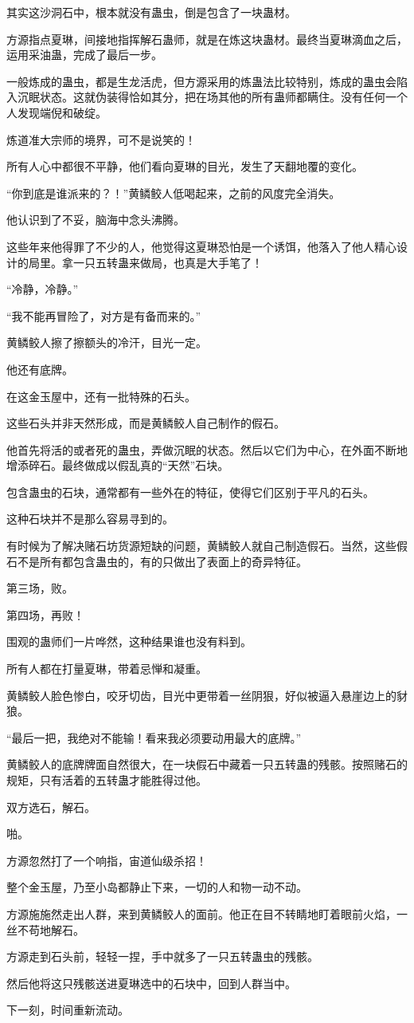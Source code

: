 \begin{this_body}
其实这沙洞石中，根本就没有蛊虫，倒是包含了一块蛊材。

方源指点夏琳，间接地指挥解石蛊师，就是在炼这块蛊材。最终当夏琳滴血之后，运用采油蛊，完成了最后一步。

一般炼成的蛊虫，都是生龙活虎，但方源采用的炼蛊法比较特别，炼成的蛊虫会陷入沉眠状态。这就伪装得恰如其分，把在场其他的所有蛊师都瞒住。没有任何一个人发现端倪和破绽。

炼道准大宗师的境界，可不是说笑的！

所有人心中都很不平静，他们看向夏琳的目光，发生了天翻地覆的变化。

“你到底是谁派来的？！”黄鳞鲛人低喝起来，之前的风度完全消失。

他认识到了不妥，脑海中念头沸腾。

这些年来他得罪了不少的人，他觉得这夏琳恐怕是一个诱饵，他落入了他人精心设计的局里。拿一只五转蛊来做局，也真是大手笔了！

“冷静，冷静。”

“我不能再冒险了，对方是有备而来的。”

黄鳞鲛人擦了擦额头的冷汗，目光一定。

他还有底牌。

在这金玉屋中，还有一批特殊的石头。

这些石头并非天然形成，而是黄鳞鲛人自己制作的假石。

他首先将活的或者死的蛊虫，弄做沉眠的状态。然后以它们为中心，在外面不断地增添碎石。最终做成以假乱真的“天然”石块。

包含蛊虫的石块，通常都有一些外在的特征，使得它们区别于平凡的石头。

这种石块并不是那么容易寻到的。

有时候为了解决赌石坊货源短缺的问题，黄鳞鲛人就自己制造假石。当然，这些假石不是所有都包含蛊虫的，有的只做出了表面上的奇异特征。

第三场，败。

第四场，再败！

围观的蛊师们一片哗然，这种结果谁也没有料到。

所有人都在打量夏琳，带着忌惮和凝重。

黄鳞鲛人脸色惨白，咬牙切齿，目光中更带着一丝阴狠，好似被逼入悬崖边上的豺狼。

“最后一把，我绝对不能输！看来我必须要动用最大的底牌。”

黄鳞鲛人的底牌牌面自然很大，在一块假石中藏着一只五转蛊的残骸。按照赌石的规矩，只有活着的五转蛊才能胜得过他。

双方选石，解石。

啪。

方源忽然打了一个响指，宙道仙级杀招！

整个金玉屋，乃至小岛都静止下来，一切的人和物一动不动。

方源施施然走出人群，来到黄鳞鲛人的面前。他正在目不转睛地盯着眼前火焰，一丝不苟地解石。

方源走到石头前，轻轻一捏，手中就多了一只五转蛊虫的残骸。

然后他将这只残骸送进夏琳选中的石块中，回到人群当中。

下一刻，时间重新流动。

\end{this_body}

